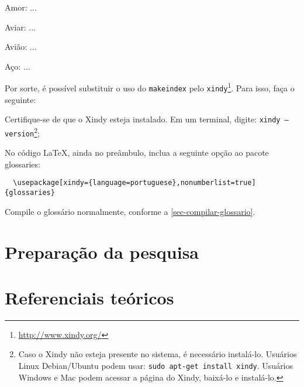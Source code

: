 \documentclass[
    12pt,				%
    openright,			%
    twoside,			%
    a4paper,			%
    english,			%
    french,				%
    spanish,			%
    brazil				%
    ]{abntex2}
\begin{document}
\begin{alineas}
 \item Amor: ...
 \item Aviar: ...
 \item Avião: ...
 \item Aço: ...
\end{alineas}

Por sorte, é possível substituir o uso do \texttt{makeindex}
pelo \texttt{xindy}\footnote{\url{http://www.xindy.org/}}. Para isso, faça o
seguinte:

\begin{alineas}
  \item Certifique-se de que o Xindy esteja instalado. Em um terminal, digite:
  \texttt{xindy --version}\footnote{Caso o Xindy não esteja presente no sistema, é necessário
    instalá-lo. Usuários Linux Debian/Ubuntu podem usar: \texttt{sudo
    apt-get install xindy}. Usuários Windows e Mac podem acessar a página do
    Xindy, baixá-lo e instalá-lo.};
  \item No código LaTeX, ainda no preâmbulo, inclua a seguinte opção ao pacote glossaries:
  \begin{verbatim}
  \usepackage[xindy={language=portuguese},nonumberlist=true]{glossaries}
  \end{verbatim}
  \item Compile o glossário normalmente, conforme a
  \autoref{sec-compilar-glossario}.
\end{alineas}


\part{Preparação da pesquisa}





\part{Referenciais teóricos}
\end{document}
